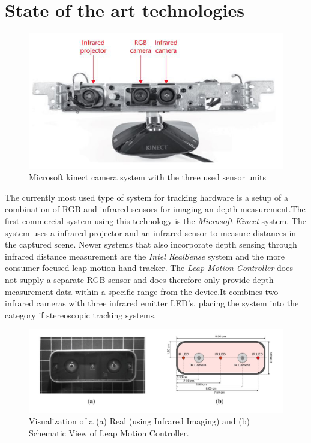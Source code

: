 \section{State of the art technologies}
\begin{figure}
\label{img:kinect}
\includegraphics[width=\textwidth/2]{images/kinnect.JPG} 
\caption{Microsoft kinect camera system with the three used sensor units\cite{Zhang.2012}}
\end{figure}
The currently most used type of system for tracking hardware is a setup of a combination of RGB and infrared sensors for imaging an depth measurement.The first commercial system using this technology is the\textit{ Microsoft Kinect} system\cite{Zhang.2012}. The system uses a infrared projector and an infrared sensor to measure distances in the captured scene.
Newer systems that also incorporate depth sensing through infrared distance measurement are the \textit{Intel RealSense} system and the more consumer focused leap motion hand tracker. The\textit{ Leap Motion Controller} does not supply a separate RGB sensor and does therefore only provide depth measurement data within a specific range from the device\cite{Weichert.2013}.It combines two infrared cameras with three infrared emitter LED's, placing the system into the category if stereoscopic tracking systems.
\begin{figure}[H]
\includegraphics[width=\textwidth]{images/leapMotion.JPG}
\caption{Visualization of a (a) Real (using Infrared Imaging) and (b) Schematic View of Leap Motion Controller\cite{Weichert.2013}.}
\label{img:leapMotion} 
\end{figure}
